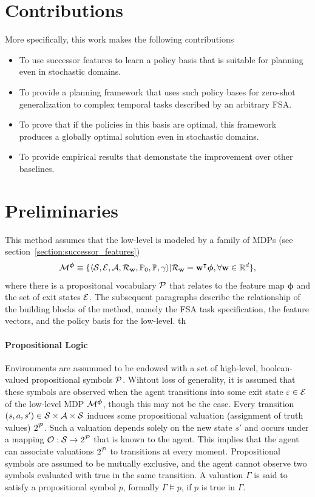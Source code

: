 \section{Contributions}
More specifically, this work makes the following contributions
 \begin{itemize}
    \item To use successor features to learn a policy basis that is suitable for planning even in stochastic domains.
    \item To provide a planning framework that uses such policy bases for zero-shot generalization to complex temporal tasks described by an arbitrary FSA.
    \item To prove that if the policies in this basis are optimal, this framework produces a globally optimal solution even in stochastic domains.
    \item To provide empirical results that demonstate the improvement over other baselines.
\end{itemize}

\section{Preliminaries}
This method assumes that the low-level is modeled by a family of MDPs (see section~\ref{section:successor_features})
\begin{equation}
  \mathcal{M}^{\boldsymbol{\phi}}\equiv\{\langle\mathcal{S},\mathcal{E},\mathcal{A},\mathcal{R}_{\mathbf{w}},\mathbb{P}_0, \mathbb{P},\gamma\rangle \lvert \mathcal{R}_{\mathbf{w}} = \mathbf{w}^\intercal \boldsymbol{\phi}, \forall\mathbf{w}\in\mathbb{R}^d\},
\end{equation}
where there is a propositonal vocabulary $\mathcal{P}$ that relates to the feature map $\boldsymbol{\phi}$ and the set of exit states $\mathcal{E}$. The subsequent paragraphs describe the relationship of the building blocks of the method, namely the FSA task specification, the feature vectors, and the policy basis for the low-level.
th

\paragraph{Propositional Logic} Environments are assummed to be endowed with a set of high-level, boolean-valued propositional symbols $\mathcal{P}$. Wihtout loss of generality, it is assumed that these symbols are observed when the agent transitions into some exit state $\varepsilon\in\mathcal{E}$ of the low-level MDP $\mathcal{M}^{\boldsymbol{\phi}}$, though this may not be the case. Every transition $(s, a, s')\in\mathcal{S}\times\mathcal{A}\times\mathcal{S}$ induces some propositional valuation (assignment of truth values) $2^{\mathcal{P}}$. Such a valuation depends solely on the new state $s'$ and occurs under a mapping ${\mathcal{O}:\mathcal{S}\rightarrow2^{\mathcal{P}}}$ that is known to the agent. This implies that the agent can associate valuations $2^{\mathcal{P}}$ to transitions at every moment. Propositional symbols are assumed to be mutually exclusive, and the agent cannot observe two symbols evaluated with true in the same transition. A valuation $\Gamma$ is said to satisfy a propositional symbol $p$, formally $\Gamma\vDash p$, if $p$ is true in $\Gamma$. 

